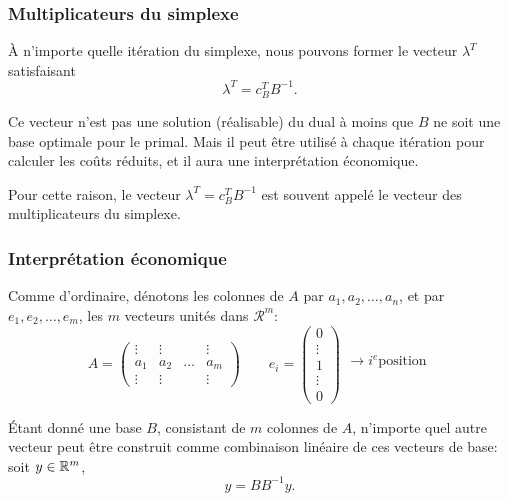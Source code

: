 \documentclass[usepdftitle=false]{beamer}
\def\cR{\mathcal{R}}
\begin{document}
\begin{frame}
\frametitle{Multiplicateurs du simplexe}

\`A n'importe quelle itération du simplexe, nous pouvons former le vecteur $\lambda^T$ satisfaisant
\[
\lambda^T = c_B^T B^{-1}.
\]

\mbox{}

Ce vecteur n'est pas une solution (réalisable) du dual à moins que $B$ ne soit une base optimale pour le primal. Mais il peut être utilisé à chaque itération pour calculer les coûts réduits, et il aura une interprétation économique.

\mbox{}

Pour cette raison, le vecteur $\lambda^T = c_B^T B^{-1}$ est souvent appelé le vecteur des multiplicateurs du simplexe.

\end{frame}

\begin{frame}
\frametitle{Interprétation économique}

Comme d'ordinaire, dénotons les colonnes de $A$ par $a_1, a_2,\ldots, a_n$, et par $e_1, e_2,\ldots, e_m$, les $m$ vecteurs unités dans $\cR^m$:
\[
A = \begin{pmatrix}
\vdots & \vdots & & \vdots \\
a_1 & a_2 & \ldots & a_m \\
\vdots & \vdots & & \vdots
\end{pmatrix}
\qquad
e_i = \begin{pmatrix}
0 \\
\vdots \\
1 \\
\vdots \\
0
\end{pmatrix}
\begin{matrix}
\\
\\
\rightarrow i^e \mbox{position} \\
\\
\\
\end{matrix}
\]

\mbox{}

\'Etant donné une base $B$, consistant de $m$ colonnes de $A$, n'importe quel autre vecteur peut être construit comme combinaison linéaire de ces vecteurs de base: soit $y \in \mathbb{R}^m$,
\[
y = B B^{-1}y.
\]

\end{frame}
\end{document}
